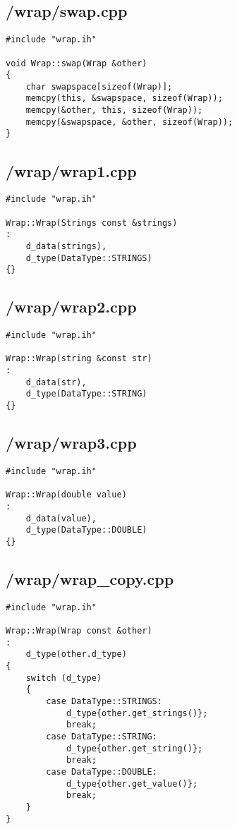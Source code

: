 \documentclass{article}
\begin{document}
\subsection*{/wrap/swap.cpp}
\begin{verbatim}
#include "wrap.ih"

void Wrap::swap(Wrap &other)
{
    char swapspace[sizeof(Wrap)];
    memcpy(this, &swapspace, sizeof(Wrap));
    memcpy(&other, this, sizeof(Wrap));
    memcpy(&swapspace, &other, sizeof(Wrap));
}
\end{verbatim}
\subsection*{/wrap/wrap1.cpp}
\begin{verbatim}
#include "wrap.ih"

Wrap::Wrap(Strings const &strings)
:
    d_data(strings),
    d_type(DataType::STRINGS)
{}
\end{verbatim}
\subsection*{/wrap/wrap2.cpp}
\begin{verbatim}
#include "wrap.ih"

Wrap::Wrap(string &const str)
:
    d_data(str),
    d_type(DataType::STRING)
{}
\end{verbatim}
\subsection*{/wrap/wrap3.cpp}
\begin{verbatim}
#include "wrap.ih"

Wrap::Wrap(double value)
:
    d_data(value),
    d_type(DataType::DOUBLE)
{}
\end{verbatim}
\subsection*{/wrap/wrap\_copy.cpp}
\begin{verbatim}
#include "wrap.ih"

Wrap::Wrap(Wrap const &other)
:
    d_type(other.d_type)
{
    switch (d_type)
    {
        case DataType::STRINGS:
            d_type{other.get_strings()};
            break;
        case DataType::STRING:
            d_type{other.get_string()};
            break;
        case DataType::DOUBLE:
            d_type{other.get_value()};
            break;
    }
}

\end{verbatim}
\end{document}
